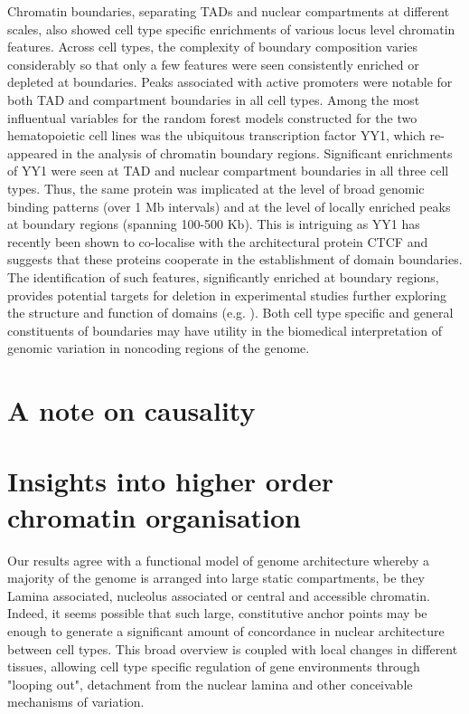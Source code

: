 \documentclass[a4paper,10pt,oneside]{book}
\begin{document}
Chromatin boundaries, separating TADs and nuclear compartments at
different scales, also showed cell type specific enrichments of
various locus level chromatin features. Across cell types, the
complexity of boundary composition varies considerably so that only a
few features were seen consistently enriched or depleted at
boundaries. Peaks associated with active promoters were notable for
both TAD and compartment boundaries in all cell types. Among the most
influentual variables for the random forest models constructed for the
two hematopoietic cell lines was the ubiquitous transcription factor
YY1, which re-appeared in the analysis of chromatin boundary
regions. Significant enrichments of YY1 were seen at TAD and nuclear
compartment boundaries in all three cell types. Thus, the same protein
was implicated at the level of broad genomic binding patterns (over 1
Mb intervals) and at the level of locally enriched peaks at boundary
regions (spanning 100-500 Kb). This is intriguing as YY1 has recently
been shown to co-localise with the architectural protein
CTCF \cite{Ong2014} and suggests that these proteins cooperate in the
establishment of domain boundaries. The identification of such
features, significantly enriched at boundary regions, provides
potential targets for deletion in experimental studies further
exploring the structure and function of domains
(e.g. \cite{Nora2012}). Both cell type specific and general
constituents of boundaries may have utility in the biomedical
interpretation of genomic variation in noncoding regions of the
genome.

\section{A note on causality}

\section{Insights into higher order chromatin organisation}


Our results agree with a functional model of genome architecture whereby a majority of the genome is arranged into large static compartments, be they Lamina associated, nucleolus associated or central and accessible chromatin. Indeed, it seems possible that such large, constitutive anchor points may be enough to generate a significant amount of concordance in nuclear architecture between cell types.\cite{Bouwman2015a} This broad overview is  coupled with local changes in different tissues, allowing cell type specific regulation of gene environments through "looping out", detachment from the nuclear lamina and other conceivable mechanisms of variation.
\end{document}

